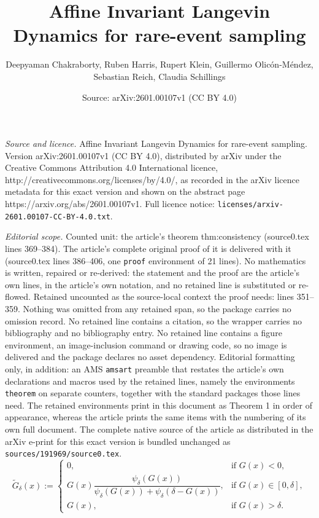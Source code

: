 \documentclass[10pt,a4paper]{amsart}
\title{Affine Invariant Langevin Dynamics for rare-event sampling}
\author{Deepyaman Chakraborty, Ruben Harris, Rupert Klein, Guillermo Olic\'on-M\'endez, Sebastian Reich, Claudia Schillings}
\date{Source: arXiv:2601.00107v1 (CC BY 4.0)}
\begin{document}
\maketitle

\noindent\emph{Source and licence.} Affine Invariant Langevin Dynamics for rare-event sampling. Version arXiv:2601.00107v1 (CC BY 4.0), distributed by arXiv under the Creative Commons Attribution 4.0 International licence, http://creativecommons.org/licenses/by/4.0/, as recorded in the arXiv licence metadata for this exact version and shown on the abstract page https://arxiv.org/abs/2601.00107v1. Full licence notice: \texttt{licenses/arxiv-2601.00107-CC-BY-4.0.txt}.\par\smallskip

\noindent\textit{Editorial scope.} Counted unit: the article's theorem thm:consistency (source0.tex lines 369--384). The article's complete original proof of it is delivered with it (source0.tex lines 386--406, one \texttt{proof} environment of 21 lines). No mathematics is written, repaired or re-derived: the statement and the proof are the article's own lines, in the article's own notation, and no retained line is substituted or re-flowed.  Retained uncounted as the source-local context the proof needs: lines 351--359.  Nothing was omitted from any retained span, so the package carries no omission record.  No retained line contains a citation, so the wrapper carries no bibliography and no bibliography entry.  No retained line contains a figure environment, an image-inclusion command or drawing code, so no image is delivered and the package declares no asset dependency.  Editorial formatting only, in addition: an AMS \texttt{amsart} preamble that restates the article's own declarations and macros used by the retained lines, namely the environments \texttt{theorem} on separate counters, together with the standard packages those lines need.  The retained environments print in this document as Theorem 1 in order of appearance, whereas the article prints the same items with the numbering of its own full document.  The complete native source of the article as distributed in the arXiv e-print for this exact version is bundled unchanged as \texttt{sources/191969/source0.tex}.
\begin{equation}
    \label{eq:smooth_G}
\tilde G_\delta(x) :=
\begin{cases}
  0, & \text{if } G(x) < 0,\\[0.3em]
  G(x)\dfrac{\psi_\delta(G(x))}{\psi_\delta(G(x))+\psi_\delta(\delta-G(x))}, & \text{if } G(x)\in[0,\delta],\\[0.7em]
  G(x), & \text{if } G(x) > \delta.
\end{cases}
\end{equation}
\end{document}
